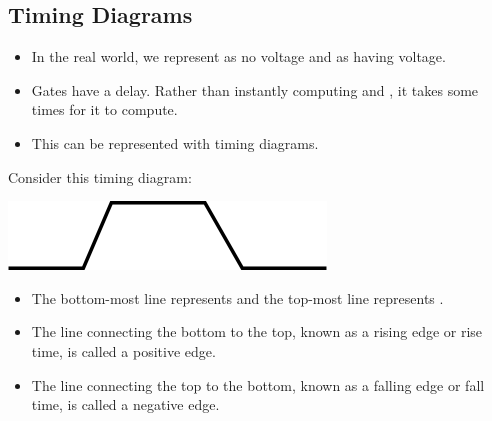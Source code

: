 \documentclass[letterpaper]{article}
\begin{document}
\subsection{Timing Diagrams}
\begin{itemize}
    \item In the real world, we represent  as no voltage and  as having voltage. 
    \item Gates have a delay. Rather than instantly computing  and , it takes some times for it to compute. 
    \item This can be represented with timing diagrams. 
\end{itemize}
Consider this timing diagram:
\begin{center}
    \includegraphics[scale=0.6]{timing_diagram.PNG}
\end{center}
\begin{itemize}
    \item The bottom-most line represents  and the top-most line represents .
    \item The line connecting the bottom to the top, known as a rising edge or rise time, is called a positive edge. 
    \item The line connecting the top to the bottom, known as a falling edge or fall time, is called a negative edge.   
\end{itemize}
\end{document}
